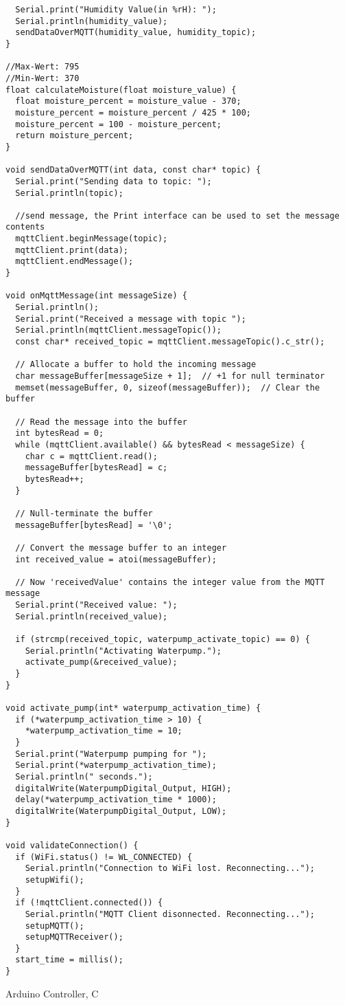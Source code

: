 \begin{longlisting}
\begin{verbatim}
  Serial.print("Humidity Value(in %rH): ");
  Serial.println(humidity_value);
  sendDataOverMQTT(humidity_value, humidity_topic);
}

//Max-Wert: 795
//Min-Wert: 370
float calculateMoisture(float moisture_value) {
  float moisture_percent = moisture_value - 370;
  moisture_percent = moisture_percent / 425 * 100;
  moisture_percent = 100 - moisture_percent;
  return moisture_percent;
}

void sendDataOverMQTT(int data, const char* topic) {
  Serial.print("Sending data to topic: ");
  Serial.println(topic);

  //send message, the Print interface can be used to set the message contents
  mqttClient.beginMessage(topic);
  mqttClient.print(data);
  mqttClient.endMessage();
}

void onMqttMessage(int messageSize) {
  Serial.println();
  Serial.print("Received a message with topic ");
  Serial.println(mqttClient.messageTopic());
  const char* received_topic = mqttClient.messageTopic().c_str();

  // Allocate a buffer to hold the incoming message
  char messageBuffer[messageSize + 1];  // +1 for null terminator
  memset(messageBuffer, 0, sizeof(messageBuffer));  // Clear the buffer

  // Read the message into the buffer
  int bytesRead = 0;
  while (mqttClient.available() && bytesRead < messageSize) {
    char c = mqttClient.read();
    messageBuffer[bytesRead] = c;
    bytesRead++;
  }

  // Null-terminate the buffer
  messageBuffer[bytesRead] = '\0';
  
  // Convert the message buffer to an integer
  int received_value = atoi(messageBuffer);

  // Now 'receivedValue' contains the integer value from the MQTT message
  Serial.print("Received value: ");
  Serial.println(received_value);

  if (strcmp(received_topic, waterpump_activate_topic) == 0) {
    Serial.println("Activating Waterpump.");
    activate_pump(&received_value);
  }
}

void activate_pump(int* waterpump_activation_time) {
  if (*waterpump_activation_time > 10) {
    *waterpump_activation_time = 10;
  }
  Serial.print("Waterpump pumping for ");
  Serial.print(*waterpump_activation_time);
  Serial.println(" seconds.");
  digitalWrite(WaterpumpDigital_Output, HIGH);
  delay(*waterpump_activation_time * 1000);
  digitalWrite(WaterpumpDigital_Output, LOW);
}

void validateConnection() {
  if (WiFi.status() != WL_CONNECTED) {
    Serial.println("Connection to WiFi lost. Reconnecting...");
    setupWifi();
  }
  if (!mqttClient.connected()) {
    Serial.println("MQTT Client disonnected. Reconnecting...");
    setupMQTT();
    setupMQTTReceiver();
  }
  start_time = millis();
}
\end{verbatim}
\caption{Arduino Controller, C}\label{cde:applicationService}
\end{longlisting}
\newpage

